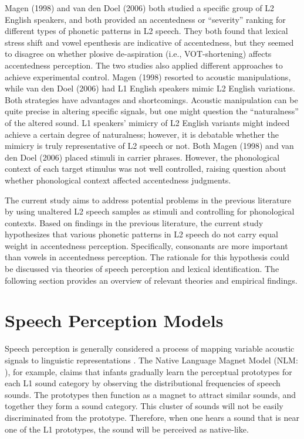Magen (1998) and van den Doel (2006) both studied a specific group of L2 English speakers, and both provided an accentedness or “severity” ranking for different types of phonetic patterns in L2 speech. They both found that lexical stress shift and vowel epenthesis are indicative of accentedness, but they seemed to disagree on whether plosive de-aspiration (i.e., VOT-shortening) affects accentedness perception. The two studies also applied different approaches to achieve experimental control. Magen (1998) resorted to acoustic manipulations, while van den Doel (2006) had L1 English speakers mimic L2 English variations. Both strategies have advantages and shortcomings. Acoustic manipulation can be quite precise in altering specific signals, but one might question the “naturalness” of the altered sound. L1 speakers’ mimicry of L2 English variants might indeed achieve a certain degree of naturalness; however, it is debatable whether the mimicry is truly representative of L2 speech or not. Both Magen (1998) and van den Doel (2006) placed stimuli in carrier phrases. However, the phonological context of each target stimulus was not well controlled, raising question about whether phonological context affected accentedness judgments.

The current study aims to address potential problems in the previous literature by using unaltered L2 speech samples as stimuli and controlling for phonological contexts. Based on findings in the previous literature, the current study hypothesizes that various phonetic patterns in L2 speech do not carry equal weight in accentedness perception. Specifically, consonants are more important than vowels in accentedness perception. The rationale for this hypothesis could be discussed via theories of speech perception and lexical identification. The following section provides an overview of relevant theories and empirical findings.


\section{Speech Perception Models}

Speech perception is generally considered a process of mapping variable acoustic signals to linguistic representations \citep{Holt_2010}. The Native Language Magnet Model (NLM: \citealp{Kuhl_1991}), for example, claims that infants gradually learn the perceptual prototypes for each L1 sound category by observing the distributional frequencies of speech sounds. The prototypes then function as a magnet to attract similar sounds, and together they form a sound category. This cluster of sounds will not be easily discriminated from the prototype. Therefore, when one hears a sound that is near one of the L1 prototypes, the sound will be perceived as native-like. 

